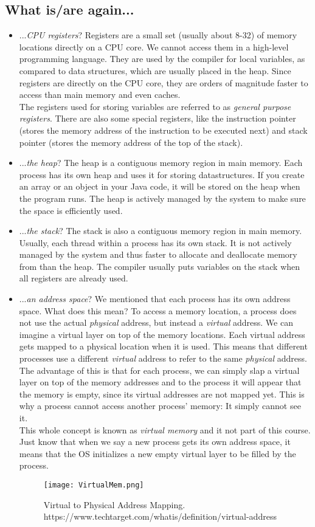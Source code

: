 \documentclass[main]{subfiles}
\begin{document}
\subsection{What is/are again...}
\begin{itemize}
  \item ...\textit{CPU registers}? Registers are a small set (usually about 8-32) of memory locations directly on a CPU core. We cannot access them in a high-level programming language. They are used by the compiler for local variables, as compared to data structures, which are usually placed in the heap. Since registers are directly on the CPU core, they are orders of magnitude faster to access than main memory and even caches.\\
  The registers used for storing variables are referred to as \textit{general purpose registers}. There are also some special registers, like the instruction pointer (stores the memory address of the instruction to be executed next) and stack pointer (stores the memory address of the top of the stack).
  \item ...\textit{the heap}? The heap is a contiguous memory region in main memory. Each process has its own heap and uses it for storing datastructures. If you create an array or an object in your Java code, it will be stored on the heap when the program runs. The heap is actively managed by the system to make sure the space is efficiently used.
  \item ...\textit{the stack}? The stack is also a contiguous memory region in main memory. Usually, each thread within a process has its own stack. It is not actively managed by the system and thus faster to allocate and deallocate memory from than the heap. The compiler usually puts variables on the stack when all registers are already used.
  \item ...\textit{an address space}? We mentioned that each process has its own address space. What does this mean? To access a memory location, a process does not use the actual \textit{physical} address, but instead a \textit{virtual} address. We can imagine a virtual layer on top of the memory locations. Each virtual address gets mapped to a physical location when it is used. This means that different processes use a different \textit{virtual} address to refer to the same \textit{physical} address. The advantage of this is that for each process, we can simply slap a virtual layer on top of the memory addresses and to the process it will appear that the memory is empty, since its virtual addresses are not mapped yet. This is why a process cannot access another process' memory: It simply cannot see it.\\
  This whole concept is known as \textit{virtual memory} and it not part of this course. Just know that when we say a new process gets its own address space, it means that the OS initializes a new empty virtual layer to be filled by the process.
    \begin{figure}[H]
        \centering
        \texttt{[image: VirtualMem.png]}
        \caption{Virtual to Physical Address Mapping. https://www.techtarget.com/whatis/definition/virtual-address}
    \end{figure}


\end{itemize}
\end{document}
